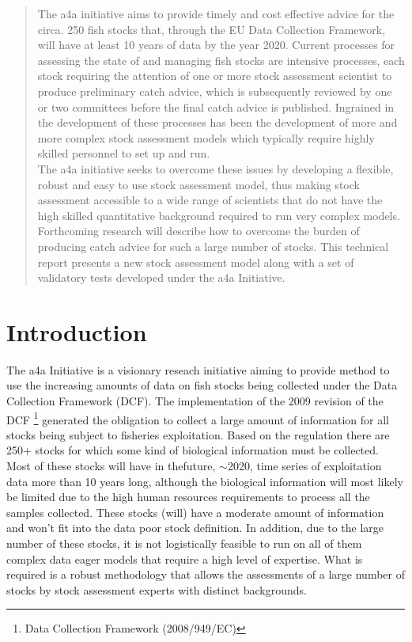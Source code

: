 \documentclass[a4paper]{article}\usepackage{graphicx, color}
\begin{document}
\begin{abstract}
The a4a initiative aims to provide timely and cost effective advice for the circa. 250 fish stocks that, through the EU Data Collection Framework, will have at least 10 years of data by the year 2020. Current processes for assessing the state of and managing fish stocks are intensive processes, each stock requiring the attention of one or more stock assessment scientist to produce preliminary catch advice, which is subsequently reviewed by one or two committees before the final catch advice is published. Ingrained in the development of these processes has been the development of more and more complex stock assessment models which typically require highly skilled personnel to set up and run. \\

The a4a initiative seeks to overcome these issues by developing a flexible, robust and easy to use stock assessment model, thus making stock assessment accessible to a wide range of scientists that do not have the high skilled quantitative background required to run very complex models. Forthcoming research will describe how to overcome the burden of producing catch advice for such a large number of stocks. This technical report presents a new stock assessment model along with a set of validatory tests developed under the a4a Initiative.
\end{abstract} 

\section*{Introduction}

The a4a Initiative is a visionary reseach initiative aiming to provide method to use the increasing amounts of data on fish stocks being collected under the Data Collection Framework (DCF). The implementation of the 2009 revision of the DCF \footnote{Data Collection Framework (2008/949/EC)} generated the obligation to collect a large amount of information for all stocks being subject to fisheries exploitation. Based on the regulation there are 250+ stocks for which some kind of biological information must be collected. Most of these stocks will have in thefuture, $\sim$2020, time series of exploitation data more than 10 years long, although the biological information will most likely be limited due to the high human resources requirements to process all the samples collected. These stocks (will) have a moderate amount of information and won't fit into the \textquotedbl{}data poor\textquotedbl{} stock definition. In addition, due to the large number of these stocks, it is not logistically feasible to run on all of them complex data eager models that require a high level of expertise. What is required is a robust methodology that allows the assessments of a large number of stocks by stock assessment experts with distinct backgrounds. 
\end{document}
